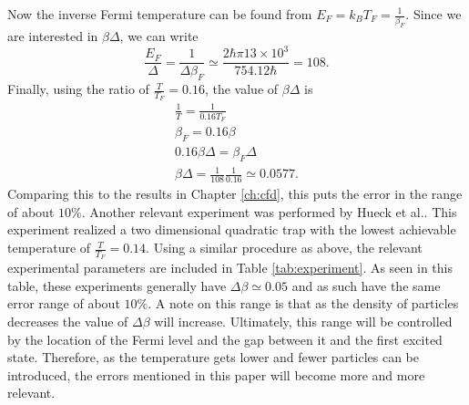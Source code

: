 Now the inverse Fermi temperature can be found from $E_F=k_B T_F=\frac{1}{\beta_F}$. Since we are interested in $\beta\Delta$, we can write
\begin{equation*}
    \frac{E_F}{\Delta}=\frac{1}{\Delta \beta_F}\simeq \frac{2\hbar \pi 13\times 10^3}{754.12\hbar}=108.
\end{equation*}
Finally, using the ratio of $\frac{T}{T_F}=0.16$, the value of $\beta\Delta$ is
\begin{align*}
    \frac{1}{T}=\frac{1}{0.16 T_F}\\
    \beta_F=0.16\beta\\
    0.16\beta\Delta=\beta_F\Delta\\
    \beta\Delta=\frac{1}{108}\frac{1}{0.16}\simeq 0.0577.
\end{align*}
Comparing this to the results in Chapter \ref{ch:cfd}, this puts the error in the range of about $10\%$. Another relevant experiment was performed by Hueck et al.\@ \cite{Hueck2018}. This experiment realized a two dimensional quadratic trap with the lowest achievable temperature of $\frac{T}{T_F}=0.14$. Using a similar procedure as above, the relevant experimental parameters are included in Table \ref{tab:experiment}. As seen in this table, these experiments generally have $\Delta\beta \simeq 0.05$ and as such have the same error range of about $10\%$. A note on this range is that as the density of particles decreases the value of $\Delta\beta$ will increase. Ultimately, this range will be controlled by the location of the Fermi level and the gap between it and the first excited state. Therefore, as the temperature gets lower and fewer particles can be introduced, the errors mentioned in this paper will become more and more relevant. 


